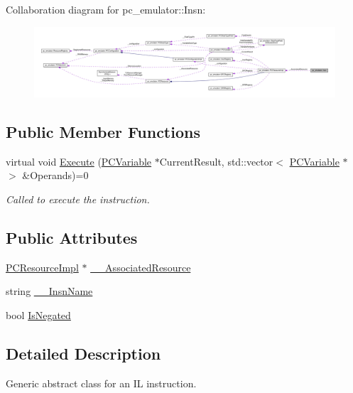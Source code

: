 Collaboration diagram for pc\+\_\+emulator\+:\+:Insn\+:\nopagebreak
\begin{figure}[H]
\begin{center}
\leavevmode
\includegraphics[width=350pt]{classpc__emulator_1_1Insn__coll__graph}
\end{center}
\end{figure}
\subsection*{Public Member Functions}
\begin{DoxyCompactItemize}
\item 
virtual void \hyperlink{classpc__emulator_1_1Insn_a103d27030e872a799e313df16c1f3d66}{Execute} (\hyperlink{classpc__emulator_1_1PCVariable}{P\+C\+Variable} $\ast$Current\+Result, std\+::vector$<$ \hyperlink{classpc__emulator_1_1PCVariable}{P\+C\+Variable} $\ast$ $>$ \&Operands)=0
\begin{DoxyCompactList}\small\item\em Called to execute the instruction. \end{DoxyCompactList}\end{DoxyCompactItemize}
\subsection*{Public Attributes}
\begin{DoxyCompactItemize}
\item 
\hyperlink{classpc__emulator_1_1PCResourceImpl}{P\+C\+Resource\+Impl} $\ast$ \hyperlink{classpc__emulator_1_1Insn_ae7cb9ec6f9eff913027042ad4e253bd4}{\+\_\+\+\_\+\+Associated\+Resource}
\item 
string \hyperlink{classpc__emulator_1_1Insn_a7921073748a0e77469b19bad52b0518b}{\+\_\+\+\_\+\+Insn\+Name}
\item 
bool \hyperlink{classpc__emulator_1_1Insn_a41aa1d28ef8bcf15ca05faaa1ccea018}{Is\+Negated}
\end{DoxyCompactItemize}


\subsection{Detailed Description}
Generic abstract class for an IL instruction. 

